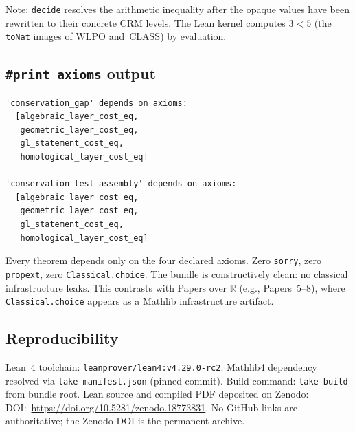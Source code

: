 \documentclass[12pt, a4paper]{article}
\theoremstyle{plain}
\theoremstyle{definition}
\theoremstyle{remark}
\newcommand{\WLPO}{\mathrm{WLPO}}
\newcommand{\CLASS}{\mathrm{CLASS}}
\begin{document}
Note: \texttt{decide} resolves the arithmetic inequality after the
opaque values have been rewritten to their concrete CRM levels.
The Lean kernel computes $3 < 5$ (the \texttt{toNat} images of
$\WLPO$ and~$\CLASS$) by evaluation.

\subsection{\texttt{\#print axioms} output}

\begin{lstlisting}
'conservation_gap' depends on axioms:
  [algebraic_layer_cost_eq,
   geometric_layer_cost_eq,
   gl_statement_cost_eq,
   homological_layer_cost_eq]

'conservation_test_assembly' depends on axioms:
  [algebraic_layer_cost_eq,
   geometric_layer_cost_eq,
   gl_statement_cost_eq,
   homological_layer_cost_eq]
\end{lstlisting}

Every theorem depends only on the four declared axioms.
Zero \texttt{sorry}, zero \texttt{propext}, zero
\texttt{Classical.choice}.  The bundle is constructively clean:
no classical infrastructure leaks.  This contrasts with Papers over
$\mathbb{R}$ (e.g., Papers~5--8), where \texttt{Classical.choice}
appears as a Mathlib infrastructure artifact.

\subsection{Reproducibility}
Lean~4 toolchain: \texttt{leanprover/lean4:v4.29.0-rc2}.
Mathlib4 dependency resolved via \texttt{lake-manifest.json} (pinned commit).
Build command: \texttt{lake build} from bundle root.
Lean source and compiled PDF deposited on Zenodo:
DOI:~\url{https://doi.org/10.5281/zenodo.18773831}.
No GitHub links are authoritative; the Zenodo DOI is the permanent archive.


\end{document}
